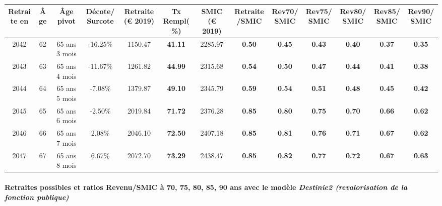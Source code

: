{ \scriptsize \begin{center} 
\begin{tabular}[htb]{|c|c||c|c||c|c||c||c|c|c|c|c|c|} 
\hline 
 Retraite en &  Âge &  Âge pivot &  Décote/Surcote &  Retraite (\euro{} 2019) &  Tx Rempl(\%) &  SMIC (\euro{} 2019) &  Retraite/SMIC &  Rev70/SMIC &  Rev75/SMIC &  Rev80/SMIC &  Rev85/SMIC &  Rev90/SMIC \\ 
\hline \hline 
 2042 &  62 &  65 ans 3 mois &  -16.25\% &  1150.47 &  {\bf 41.11} &  2285.97 &  {\bf {\color{red} 0.50}} &  {\bf {\color{red} 0.45}} &  {\bf {\color{red} 0.43}} &  {\bf {\color{red} 0.40}} &  {\bf {\color{red} 0.37}} &  {\bf {\color{red} 0.35}} \\ 
\hline 
 2043 &  63 &  65 ans 4 mois &  -11.67\% &  1261.82 &  {\bf 44.99} &  2315.68 &  {\bf {\color{red} 0.54}} &  {\bf {\color{red} 0.50}} &  {\bf {\color{red} 0.47}} &  {\bf {\color{red} 0.44}} &  {\bf {\color{red} 0.41}} &  {\bf {\color{red} 0.38}} \\ 
\hline 
 2044 &  64 &  65 ans 5 mois &  -7.08\% &  1379.87 &  {\bf 49.10} &  2345.79 &  {\bf {\color{red} 0.59}} &  {\bf {\color{red} 0.54}} &  {\bf {\color{red} 0.51}} &  {\bf {\color{red} 0.48}} &  {\bf {\color{red} 0.45}} &  {\bf {\color{red} 0.42}} \\ 
\hline 
 2045 &  65 &  65 ans 6 mois &  -2.50\% &  2019.84 &  {\bf 71.72} &  2376.28 &  {\bf {\color{red} 0.85}} &  {\bf {\color{red} 0.80}} &  {\bf {\color{red} 0.75}} &  {\bf {\color{red} 0.70}} &  {\bf {\color{red} 0.66}} &  {\bf {\color{red} 0.62}} \\ 
\hline 
 2046 &  66 &  65 ans 7 mois &  2.08\% &  2046.10 &  {\bf 72.50} &  2407.18 &  {\bf {\color{red} 0.85}} &  {\bf {\color{red} 0.81}} &  {\bf {\color{red} 0.76}} &  {\bf {\color{red} 0.71}} &  {\bf {\color{red} 0.67}} &  {\bf {\color{red} 0.62}} \\ 
\hline 
 2047 &  67 &  65 ans 8 mois &  6.67\% &  2072.70 &  {\bf 73.29} &  2438.47 &  {\bf {\color{red} 0.85}} &  {\bf {\color{red} 0.82}} &  {\bf {\color{red} 0.77}} &  {\bf {\color{red} 0.72}} &  {\bf {\color{red} 0.67}} &  {\bf {\color{red} 0.63}} \\ 
\hline 
\hline 
\end{tabular} 
\end{center} } 
\paragraph{Retraites possibles et ratios Revenu/SMIC à 70, 75, 80, 85, 90 ans avec le modèle \emph{Destinie2 (revalorisation de la fonction publique)}}  
 
